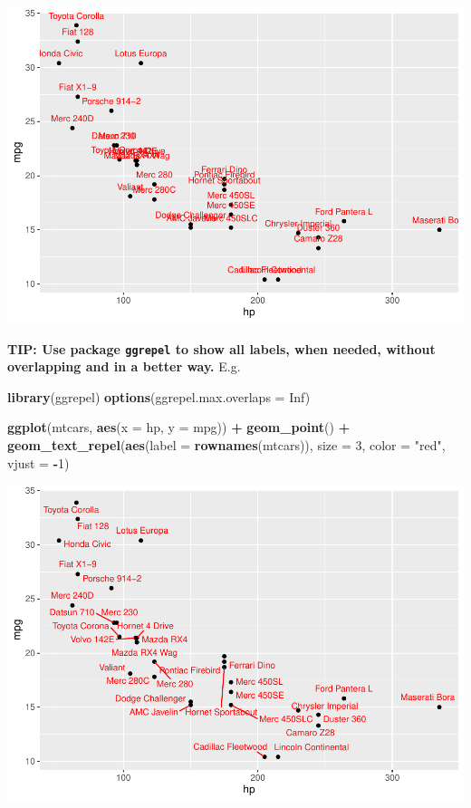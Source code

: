\documentclass[
]{book}
\newenvironment{Shaded}{\begin{snugshade}}{\end{snugshade}}
\newcommand{\AttributeTok}[1]{\textcolor[rgb]{0.13,0.29,0.53}{#1}}
\newcommand{\ConstantTok}[1]{\textcolor[rgb]{0.56,0.35,0.01}{#1}}
\newcommand{\DecValTok}[1]{\textcolor[rgb]{0.00,0.00,0.81}{#1}}
\newcommand{\FunctionTok}[1]{\textcolor[rgb]{0.13,0.29,0.53}{\textbf{#1}}}
\newcommand{\NormalTok}[1]{#1}
\newcommand{\SpecialCharTok}[1]{\textcolor[rgb]{0.81,0.36,0.00}{\textbf{#1}}}
\newcommand{\StringTok}[1]{\textcolor[rgb]{0.31,0.60,0.02}{#1}}
\begin{document}
\includegraphics{DauR_files/figure-latex/unnamed-chunk-212-1.pdf}

\textbf{TIP: Use package \texttt{ggrepel} to show all labels, when needed, without overlapping and in a better way.} E.g.

\begin{Shaded}
\begin{Highlighting}[]
\FunctionTok{library}\NormalTok{(ggrepel)}
\FunctionTok{options}\NormalTok{(}\AttributeTok{ggrepel.max.overlaps =} \ConstantTok{Inf}\NormalTok{)}

\FunctionTok{ggplot}\NormalTok{(mtcars, }\FunctionTok{aes}\NormalTok{(}\AttributeTok{x =}\NormalTok{ hp, }\AttributeTok{y =}\NormalTok{ mpg)) }\SpecialCharTok{+}
  \FunctionTok{geom\_point}\NormalTok{() }\SpecialCharTok{+}
  \FunctionTok{geom\_text\_repel}\NormalTok{(}\FunctionTok{aes}\NormalTok{(}\AttributeTok{label =} \FunctionTok{rownames}\NormalTok{(mtcars)),}
            \AttributeTok{size =} \DecValTok{3}\NormalTok{,}
            \AttributeTok{color =} \StringTok{"red"}\NormalTok{,}
            \AttributeTok{vjust =} \SpecialCharTok{{-}}\DecValTok{1}\NormalTok{)}
\end{Highlighting}
\end{Shaded}

\includegraphics{DauR_files/figure-latex/unnamed-chunk-213-1.pdf}
\end{document}
